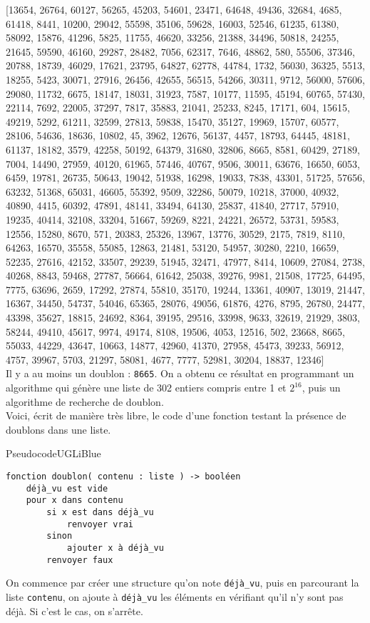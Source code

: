 \documentclass[a4paper,10pt,cours]{nsi}
\begin{document}
\scriptsize
[13654, 26764, 60127, 56265, 45203, 54601, 23471, 64648, 49436, 32684, 4685, 61418, 8441, 10200, 29042, 55598, 35106, 59628, 16003, 52546, 61235, 61380, 58092, 15876, 41296, 5825, 11755, 46620, 33256, 21388, 34496, 50818, 24255, 21645, 59590, 46160, 29287, 28482, 7056, 62317, 7646, 48862, 580, 55506, 37346, 20788, 18739, 46029, 17621, 23795, 64827, 62778, 44784, 1732, 56030, 36325, 5513, 18255, 5423, 30071, 27916, 26456, 42655, 56515, 54266, 30311, 9712, 56000, 57606, 29080, 11732, 6675, 18147, 18031, 31923, 7587, 10177, 11595, 45194, 60765, 57430, 22114, 7692, 22005, 37297, 7817, 35883, 21041, 25233, 8245, 17171, 604, 15615, 49219, 5292, 61211, 32599, 27813, 59838, 15470, 35127, 19969, 15707, 60577, 28106, 54636, 18636, 10802, 45, 3962, 12676, 56137, 4457, 18793, 64445, 48181, 61137, 18182, 3579, 42258, 50192, 64379, 31680, 32806, 8665, 8581, 60429, 27189, 7004, 14490, 27959, 40120, 61965, 57446, 40767, 9506, 30011, 63676, 16650, 6053, 6459, 19781, 26735, 50643, 19042, 51938, 16298, 19033, 7838, 43301, 51725, 57656, 63232, 51368, 65031, 46605, 55392, 9509, 32286, 50079, 10218, 37000, 40932, 40890, 4415, 60392, 47891, 48141, 33494, 64130, 25837, 41840, 27717, 57910, 19235, 40414, 32108, 33204, 51667, 59269, 8221, 24221, 26572, 53731, 59583, 12556, 15280, 8670, 571, 20383, 25326, 13967, 13776, 30529, 2175, 7819, 8110, 64263, 16570, 35558, 55085, 12863, 21481, 53120, 54957, 30280, 2210, 16659, 52235, 27616, 42152, 33507, 29239, 51945, 32471, 47977, 8414, 10609, 27084, 2738, 40268, 8843, 59468, 27787, 56664, 61642, 25038, 39276, 9981, 21508, 17725, 64495, 7775, 63696, 2659, 17292, 27874, 55810, 35170, 19244, 13361, 40907, 13019, 21447, 16367, 34450, 54737, 54046, 65365, 28076, 49056, 61876, 4276, 8795, 26780, 24477, 43398, 35627, 18815, 24692, 8364, 39195, 29516, 33998, 9633, 32619, 21929, 3803, 58244, 49410, 45617, 9974, 49174, 8108, 19506, 4053, 12516, 502, 23668, 8665, 55033, 44229, 43647, 10663, 14877, 42960, 41370, 27958, 45473, 39233, 56912, 4757, 39967, 5703, 21297, 58081, 4677, 7777, 52981, 30204, 18837, 12346]
\normalsize\\

Il y a au moins un doublon : \texttt{8665}. On a obtenu ce résultat en programmant un algorithme qui génère une liste de 302 entiers compris entre 1 et $2^{16}$, puis un algorithme de recherche de doublon.\\
Voici, écrit de manière très libre, le code d'une fonction testant la présence de doublons dans une liste.

\begin{encadrecolore}{Pseudocode}{UGLiBlue}
    
    \begin{verbatim}
fonction doublon( contenu : liste ) -> booléen
    déjà_vu est vide
    pour x dans contenu
        si x est dans déjà_vu
            renvoyer vrai
        sinon
            ajouter x à déjà_vu
        renvoyer faux
\end{verbatim}
\end{encadrecolore}
On commence par créer une structure qu'on note \texttt{déjà\_vu}, puis en parcourant la liste \texttt{contenu}, on ajoute à \texttt{déjà\_vu} les éléments en vérifiant qu'il n'y sont pas déjà. Si c'est le cas, on s'arrête.
\end{document}
